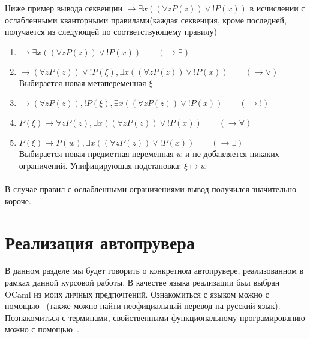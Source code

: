 \documentclass{cw1}
\begin{document}
Ниже пример вывода секвенции  $\rightarrow \exists x ((\forall z P(z)) \vee !P(x))$ в исчислении с ослабленными
кванторными правилами(каждая секвенция, кроме последней, получается из следующей по соответствующему
правилу)
\begin{enumerate}
 \item $ \rightarrow \exists x ((\forall z P(z)) \vee !P(x)) \qquad (\rightarrow \exists)$
 \item $ \rightarrow (\forall z P(z)) \vee !P(\xi), \exists x ((\forall z P(z)) \vee !P(x))  \qquad (\rightarrow \vee)$\\
 Выбирается новая метапеременная $\xi$
 \item $ \rightarrow (\forall z P(z)), !P(\xi), \exists x ((\forall z P(z)) \vee !P(x))  \qquad (\rightarrow !)$
 \item $P(\xi) \rightarrow \forall z P(z), \exists x ((\forall z P(z)) \vee !P(x))  \qquad (\rightarrow \forall)$
 \item $P(\xi) \rightarrow P(w), \exists x ((\forall z P(z)) \vee !P(x))  \qquad (\rightarrow \exists)$\\
 Выбирается новая предметная переменная $w$ и не добавляется никаких ограничений.
 Унифицирующая подстановка: $\xi \mapsto w$
\end{enumerate}
\paragraph{}
В случае правил с ослабленными ограничениями вывод получился значительно короче.


\section{Реализация автопрувера}
В данном разделе мы будет говорить о конкретном автопрувере, реализованном в рамках данной
курсовой работы.
В качестве языка реализации был выбран OCaml из моих личных предпочтений.
Ознакомиться с языком можно с помощью~\cite{OCamlManual} (также можно найти неофициальный
перевод на русский язык). Познакомиться с терминами, свойственными функциональному програмированию
 можно с помощью~\cite{FuncDT}.
\end{document}
